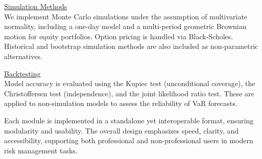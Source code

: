 \underline{Simulation Methods} \\
We implement Monte Carlo simulations under the assumption of multivariate normality, including a one-day model and a multi-period geometric Brownian motion for equity portfolios. Option pricing is handled via Black-Scholes. Historical and bootstrap simulation methods are also included as non-parametric alternatives.

\underline{Backtesting} \\
Model accuracy is evaluated using the Kupiec test (unconditional coverage), the Christoffersen test (independence), and the joint likelihood ratio test. These are applied to non-simulation models to assess the reliability of VaR forecasts.

Each module is implemented in a standalone yet interoperable format, ensuring modularity and usability. The overall design emphasizes speed, clarity, and accessibility, supporting both professional and non-professional users in modern risk management tasks.
